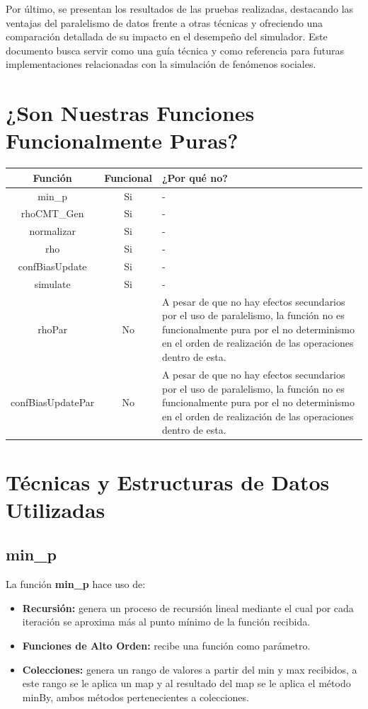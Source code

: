 \documentclass{article}
\begin{document}
Por último, se presentan los resultados de las pruebas realizadas, destacando las ventajas del paralelismo de datos frente a otras técnicas y ofreciendo una comparación detallada de su impacto en el desempeño del simulador. Este documento busca servir como una guía técnica y como referencia para futuras implementaciones relacionadas con la simulación de fenómenos sociales.


  \section{¿Son Nuestras Funciones Funcionalmente Puras?}

  \begin{table}[H]
    \centering
    \begin{tabular}{|c|c|p{5cm}|}
    \hline
    \textbf{Función} & \textbf{Funcional} & \textbf{¿Por qué no?} \\ \hline
    min\_p & Si & - \\ \hline
    rhoCMT\_Gen & Si & - \\ \hline
    normalizar & Si & - \\ \hline
    rho & Si & - \\ \hline
    confBiasUpdate & Si & - \\ \hline
    simulate & Si & - \\ \hline
    rhoPar & No & A pesar de que no hay efectos secundarios por el uso de paralelismo, la función no es funcionalmente pura por el no determinismo en el orden de realización de las operaciones dentro de esta. \\ \hline
    confBiasUpdatePar & No & A pesar de que no hay efectos secundarios por el uso de paralelismo, la función no es funcionalmente pura por el no determinismo en el orden de realización de las operaciones dentro de esta. \\ \hline
    \end{tabular}
  \end{table}

  \section{Técnicas y Estructuras de Datos Utilizadas}
    
    \subsection{min\_p}
    La función \textbf{min\_p} hace uso de:

    \begin{itemize}
      \item \textbf{Recursión:} genera un proceso de recursión lineal mediante el cual por cada iteración se aproxima más al punto mínimo de la función recibida.
      \item \textbf{Funciones de Alto Orden:} recibe una función como parámetro.
      \item \textbf{Colecciones:} genera un rango de valores a partir del min y max recibidos, a este rango se le aplica un map y al resultado del map se le aplica el método minBy, ambos métodos pertenecientes a colecciones.
    \end{itemize}
\end{document}
